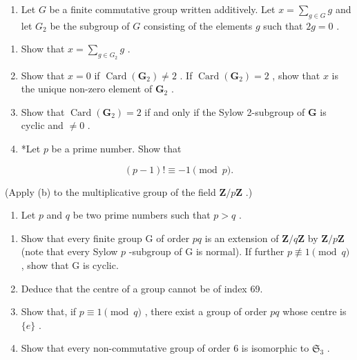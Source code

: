 \begin{enumerate}
\def\labelenumi{\arabic{enumi}.}
\setcounter{enumi}{19}
\tightlist
\item
  Let \(G\) be a finite commutative group written additively. Let \(x = \sum_{g \in G} g\) and let \(G_2\) be the subgroup of \(G\) consisting of the elements \(g\) such that \(2g = 0\) .
\end{enumerate}

\begin{enumerate}
\def\labelenumi{(\alph{enumi})}
\item
  Show that \(x = \sum_{g \in G_2} g\) .
\item
  Show that \(x = 0\) if \(\operatorname{Card}(\mathbf{G}_2) \neq 2\) . If \(\operatorname{Card}(\mathbf{G}_2) = 2\) , show that \(x\) is the unique non-zero element of \(\mathbf{G}_2\) .
\item
  Show that \(\operatorname{Card}(\mathbf{G}_2) = 2\) if and only if the Sylow 2-subgroup of \(\mathbf{G}\) is cyclic and \(\neq 0\) .
\item
  *Let \(p\) be a prime number. Show that
\end{enumerate}

\[
(p - 1)! \equiv - 1 \pmod {p}.
\]

(Apply (b) to the multiplicative group of the field \(\mathbf{Z} / p\mathbf{Z}\) .)

\begin{enumerate}
\def\labelenumi{\arabic{enumi}.}
\setcounter{enumi}{20}
\tightlist
\item
  Let \(p\) and \(q\) be two prime numbers such that \(p > q\) .
\end{enumerate}

\begin{enumerate}
\def\labelenumi{(\alph{enumi})}
\item
  Show that every finite group G of order \(pq\) is an extension of \(\mathbf{Z}/q\mathbf{Z}\) by \(\mathbf{Z}/p\mathbf{Z}\) (note that every Sylow \(p\) -subgroup of G is normal). If further \(p \not\equiv 1 \pmod{q}\) , show that G is cyclic.
\item
  Deduce that the centre of a group cannot be of index 69.
\item
  Show that, if \(p \equiv 1 \pmod{q}\) , there exist a group of order \(pq\) whose centre is \(\{e\}\) .
\item
  Show that every non-commutative group of order 6 is isomorphic to \(\mathfrak{S}_3\) .
\end{enumerate}

